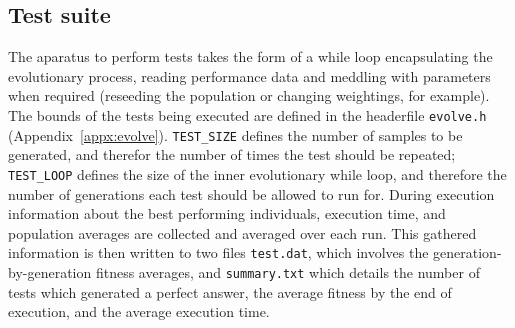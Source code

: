 \subsection{Test suite}
The aparatus to perform tests takes the form of a while loop encapsulating the
evolutionary process, reading performance data and meddling with parameters when
required (reseeding the population or changing weightings, for example). The
bounds of the tests being executed are defined in the headerfile \texttt{evolve.h}
(Appendix~\ref{appx:evolve}). \texttt{TEST\_SIZE} defines the number of samples
to be generated, and therefor the number of times the test should be repeated;
\texttt{TEST\_LOOP} defines the size of the inner evolutionary while loop, and
therefore the number of generations each test should be allowed to run for.
During execution information about the best performing individuals, execution time,
and population averages are collected and averaged over each run. This gathered
information is then written to two files \texttt{test.dat}, which involves the
generation-by-generation fitness averages, and \texttt{summary.txt} which details
the number of tests which generated a perfect answer, the average fitness by the
end of execution, and the average execution time.
